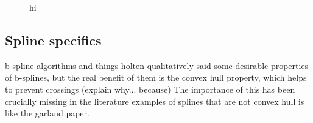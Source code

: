 \begin{figure}
    \caption[Pseudocode for power-confluent drawing]{hi} 
    \label{fig:pseudocode_pcd}
\end{figure}

\subsection{Spline specifics}
\label{sec:bspline_details}
b-spline algorithms and things
holten qualitatively said some desirable properties of b-splines, but the real benefit of them is the convex hull property, which helps to prevent crossings (explain why... because)
The importance of this has been crucially missing in the literature
examples of splines that are not convex hull is like the garland paper.

